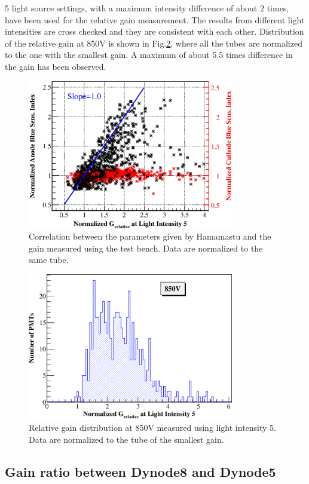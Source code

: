 \documentclass[review, times]{elsarticle}
\begin{document}
5 light source settings, with a maximum intensity difference of about 2 times, have been used for the relative gain measurement.
The results from different light intensities are cross checked and they are consistent with each other.
Distribution of the relative gain at 850V is shown in Fig.\ref{fig:FIG9}, where all the tubes are normalized to the one with the smallest gain. 
A maximum of about 5.5 times difference in the gain has been observed.

\begin{figure}
 \centering
 \includegraphics[width=90mm]{FIG8}
\caption{Correlation between the parameters given by Hamamastu and the gain measured using the test bench.
Data are normalized to the same tube.}
\label{fig:FIG8}
\end{figure} 

\begin{figure}
 \centering
 \includegraphics[width=90mm]{FIG9}
\caption{Relative gain distribution at 850V measured using light intensity 5.
Data are normalized to the tube of the smallest gain.}
\label{fig:FIG9}
\end{figure}

\subsection{Gain ratio between Dynode8 and Dynode5}
\label{sec:psd_dy58}
\end{document}
